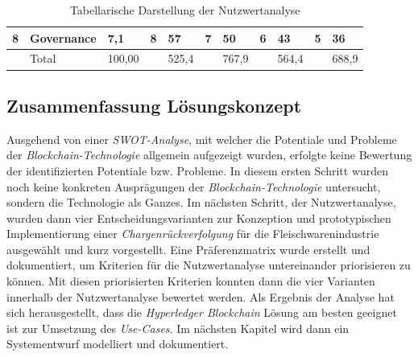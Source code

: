 \begin{landscape}
\begin{table}[H]
\begin{tabular}{@{}lllllllllll@{}}
	8         & Governance               & 7,1        & 8            & 57            & 7                 & 50                 & 6          & 43          & 5           & 36           \\
	\midrule
			  & Total                    & 100,00     &              & 525,4         &                   & 767,9              &            & 564,4       &             & 688,9        \\
	\bottomrule
	\end{tabular}
	\caption{Tabellarische Darstellung der Nutzwertanalyse}
	\label{tab:nutzwertanalyse}
	\end{table}
\end{landscape}

\subsection{Zusammenfassung Lösungskonzept}
Ausgehend von einer \textit{SWOT-Analyse}, mit welcher die Potentiale und Probleme der \textit{Blockchain-Technologie} allgemein aufgezeigt wurden, erfolgte keine Bewertung der identifizierten Potentiale bzw. Probleme. In diesem ersten Schritt wurden noch keine konkreten Ausprägungen der \textit{Blockchain-Technologie} untersucht, sondern die Technologie als Ganzes. Im nächsten Schritt, der Nutzwertanalyse, wurden dann vier Entscheidungsvarianten zur Konzeption und prototypischen Implementierung einer \textit{Chargenrückverfolgung} für die Fleischwarenindustrie ausgewählt und kurz vorgestellt. Eine Präferenzmatrix wurde erstellt und dokumentiert, um Kriterien für die Nutzwertanalyse untereinander priorisieren zu können. Mit diesen priorisierten Kriterien konnten dann die vier Varianten innerhalb der Nutzwertanalyse bewertet werden. Als Ergebnis der Analyse hat sich herausgestellt, dass die \textit{Hyperledger Blockchain} Lösung am besten geeignet ist zur Umsetzung des \textit{Use-Cases}. Im nächsten Kapitel wird dann ein Systementwurf modelliert und dokumentiert.

\newpage

